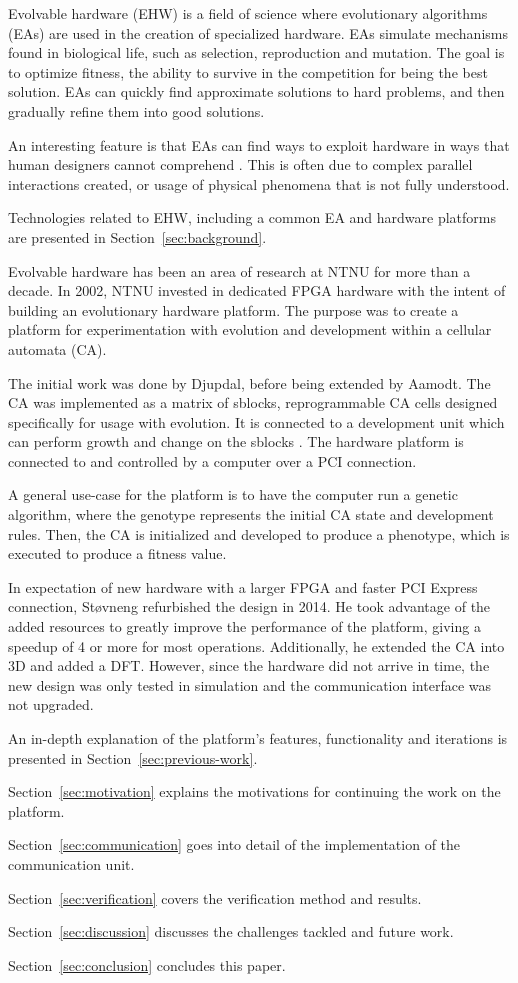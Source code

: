 Evolvable hardware (EHW) is a field of science where evolutionary algorithms (EAs) are used in the creation of specialized hardware.
EAs simulate mechanisms found in biological life, such as selection, reproduction and mutation.
The goal is to optimize fitness, the ability to survive in the competition for being the best solution.
EAs can quickly find approximate solutions to hard problems, and then gradually refine them into good solutions.

An interesting feature is that EAs can find ways to exploit hardware in ways that human designers cannot comprehend \cite{miller2014evolution}.
This is often due to complex parallel interactions created, or usage of physical phenomena that is not fully understood.

Technologies related to EHW, including a common EA and hardware platforms are presented in Section~\ref{sec:background}.

Evolvable hardware has been an area of research at NTNU for more than a decade.
In 2002, NTNU invested in dedicated FPGA hardware with the intent of building an evolutionary hardware platform.
The purpose was to create a platform for experimentation with evolution and development within a cellular automata (CA).

The initial work was done by Djupdal, before being extended by Aamodt.
The CA was implemented as a matrix of sblocks, reprogrammable CA cells designed specifically for usage with evolution.
It is connected to a development unit which can perform growth and change on the sblocks .
The hardware platform is connected to and controlled by a computer over a PCI connection.

A general use-case for the platform is to have the computer run a genetic algorithm, where the genotype represents the initial CA state and development rules.
Then, the CA is initialized and developed to produce a phenotype, which is executed to produce a fitness value.

In expectation of new hardware with a larger FPGA and faster PCI Express connection, Støvneng refurbished the design in 2014.
He took advantage of the added resources to greatly improve the performance of the platform, giving a speedup of 4 or more for most operations.
Additionally, he extended the CA into 3D and added a DFT.
However, since the hardware did not arrive in time, the new design was only tested in simulation and the communication interface was not upgraded.

An in-depth explanation of the platform's features, functionality and iterations is presented in Section~\ref{sec:previous-work}.


Section~\ref{sec:motivation} explains the motivations for continuing the work on the platform.

Section~\ref{sec:communication} goes into detail of the implementation of the communication unit.

Section~\ref{sec:verification} covers the verification method and results.

Section~\ref{sec:discussion} discusses the challenges tackled and future work.

Section~\ref{sec:conclusion} concludes this paper.

